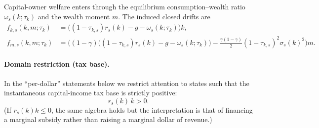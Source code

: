 \documentclass{article}
\begin{document}
Capital-owner welfare enters through the equilibrium consumption--wealth ratio $\omega_s(k;\tau_k)$ and the wealth moment $m$. The induced closed drifts are
\begin{align}
\label{eq:drift_k}
f_{k,s}(k,m;\tau_k)
&= \Big((1-\tau_{k,s})r_s(k) - g - \omega_s(k;\tau_k)\Big)k,\\[4pt]
\label{eq:drift_m}
f_{m,s}(k,m;\tau_k)
&=
\Bigg(
(1-\gamma)\Big((1-\tau_{k,s})r_s(k) - g - \omega_s(k;\tau_k)\Big)
-\frac{\gamma(1-\gamma)}{2}(1-\tau_{k,s})^2\sigma_s(k)^2
\Bigg)m.
\end{align}

\paragraph{Domain restriction (tax base).}
In the ``per-dollar'' statements below we restrict attention to states such that the instantaneous capital-income tax base is strictly positive:
\begin{equation}
\label{eq:tax_base_positive}
r_s(k)\,k>0.
\end{equation}
(If $r_s(k)k\le 0$, the same algebra holds but the interpretation is that of financing a marginal subsidy rather than raising a marginal dollar of revenue.)
\end{document}
